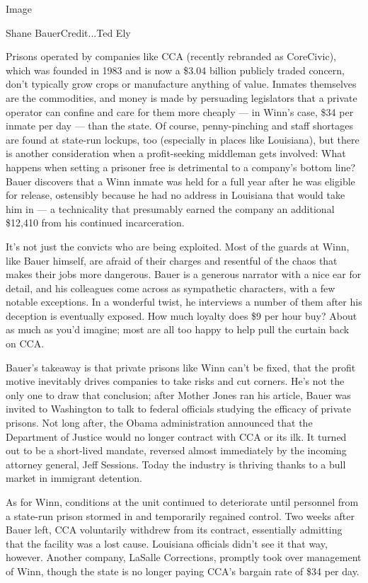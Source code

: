 Image

Shane BauerCredit...Ted Ely

Prisons operated by companies like CCA (recently rebranded as
CoreCivic), which was founded in 1983 and is now a \$3.04 billion
publicly traded concern, don't typically grow crops or manufacture
anything of value. Inmates themselves are the commodities, and money is
made by persuading legislators that a private operator can confine and
care for them more cheaply --- in Winn's case, \$34 per inmate per day
--- than the state. Of course, penny-pinching and staff shortages are
found at state-run lockups, too (especially in places like Louisiana),
but there is another consideration when a profit-seeking middleman gets
involved: What happens when setting a prisoner free is detrimental to a
company's bottom line? Bauer discovers that a Winn inmate was held for a
full year after he was eligible for release, ostensibly because he had
no address in Louisiana that would take him in --- a technicality that
presumably earned the company an additional \$12,410 from his continued
incarceration.

It's not just the convicts who are being exploited. Most of the guards
at Winn, like Bauer himself, are afraid of their charges and resentful
of the chaos that makes their jobs more dangerous. Bauer is a generous
narrator with a nice ear for detail, and his colleagues come across as
sympathetic characters, with a few notable exceptions. In a wonderful
twist, he interviews a number of them after his deception is eventually
exposed. How much loyalty does \$9 per hour buy? About as much as you'd
imagine; most are all too happy to help pull the curtain back on CCA.

Bauer's takeaway is that private prisons like Winn can't be fixed, that
the profit motive inevitably drives companies to take risks and cut
corners. He's not the only one to draw that conclusion; after Mother
Jones ran his article, Bauer was invited to Washington to talk to
federal officials studying the efficacy of private prisons. Not long
after, the Obama administration announced that the Department of Justice
would no longer contract with CCA or its ilk. It turned out to be a
short-lived mandate, reversed almost immediately by the incoming
attorney general, Jeff Sessions. Today the industry is thriving thanks
to a bull market in immigrant detention.

As for Winn, conditions at the unit continued to deteriorate until
personnel from a state-run prison stormed in and temporarily regained
control. Two weeks after Bauer left, CCA voluntarily withdrew from its
contract, essentially admitting that the facility was a lost cause.
Louisiana officials didn't see it that way, however. Another company,
LaSalle Corrections, promptly took over management of Winn, though the
state is no longer paying CCA's bargain rate of \$34 per day.

